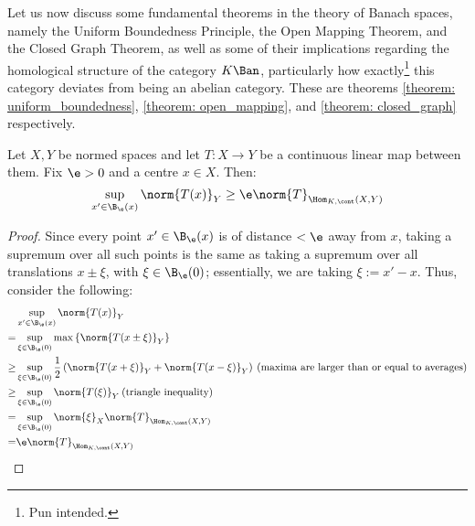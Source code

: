         Let us now discuss some fundamental theorems in the theory of Banach spaces, namely the Uniform Boundedness Principle, the Open Mapping Theorem, and the Closed Graph Theorem, as well as some of their implications regarding the homological structure of the category $K\-\Ban$, particularly how exactly\footnote{Pun intended.} this category deviates from being an abelian category. These are theorems \ref{theorem: uniform_boundedness}, \ref{theorem: open_mapping}, and \ref{theorem: closed_graph} respectively.
        \begin{lemma} \label{lemma: suprema_of_averages}
            Let $X, Y$ be normed spaces and let $T: X \to Y$ be a continuous linear map between them. Fix $\e > 0$ and a centre $x \in X$. Then:
                $$\sup_{x' \in \B_{\e}(x)} \norm{T(x)}_Y \geq \e \norm{T}_{\Hom_{K, \cont}(X, Y)}$$
        \end{lemma}
            \begin{proof}
                Since every point $x' \in \B_{\e}(x)$ is of distance $< \e$ away from $x$, taking a supremum over all such points is the same as taking a supremum over all translations $x \pm \xi$, with $\xi \in \B_{\e}(0)$; essentially, we are taking $\xi := x' - x$. Thus, consider the following:
                    $$
                        \begin{aligned}
                            & \sup_{x' \in \B_{\e}(x)} \norm{T(x)}_Y
                            \\
                            = & \sup_{\xi \in \B_{\e}(0)} \max\left\{ \norm{T(x \pm \xi)}_Y \right\}
                            \\
                            \geq & \sup_{\xi \in \B_{\e}(0)} \frac12\left( \norm{T(x + \xi)}_Y + \norm{T(x - \xi)}_Y \right) \: \text{(maxima are larger than or equal to averages)}
                            \\
                            \geq & \sup_{\xi \in \B_{\e}(0)} \norm{T(\xi)}_Y \: \text{(triangle inequality)}
                            \\
                            = & \sup_{\xi \in \B_{\e}(0)} \norm{\xi}_X \norm{T}_{\Hom_{K, \cont}(X, Y)}
                            \\
                            = & \e \norm{T}_{\Hom_{K, \cont}(X, Y)}
                        \end{aligned}
                    $$
            \end{proof}
